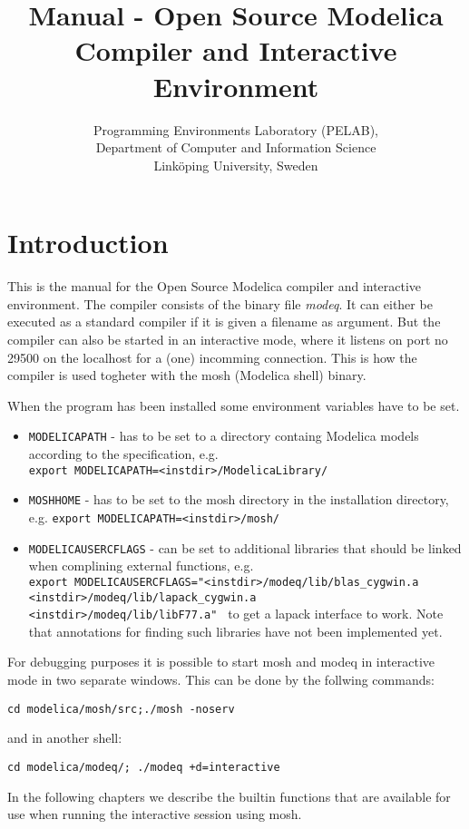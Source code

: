 \documentclass{report}
\title{Manual - Open Source Modelica Compiler and Interactive Environment}
\author{Programming Environments Laboratory (PELAB), \\ Department of Computer and Information Science \\ Link\"{o}ping University, Sweden}
\begin{document}
\maketitle
\chapter{Introduction}
This is the manual for the Open Source Modelica compiler and
interactive environment. The compiler consists of the binary file
\emph{modeq}. It can either be executed as a standard compiler if it
is given a filename as argument. But the compiler can also be started
in an interactive mode, where it listens on port no 29500 on the
localhost for a (one) incomming connection. This is how the compiler
is used togheter with the mosh (Modelica shell) binary.

When the program has been installed some environment variables have to
be set.
\begin{itemize}
\item{{\tt MODELICAPATH}} - has to be set to a directory containg Modelica
models according to the specification, e.g.  \\ {\tt export
MODELICAPATH=<instdir>/ModelicaLibrary/ }
\item{{\tt MOSHHOME}} - has to be set to the mosh directory in the
installation directory, e.g. {\tt export
MODELICAPATH=<instdir>/mosh/ } 
\item{{\tt MODELICAUSERCFLAGS}} - can be set to additional libraries
that should be linked when complining external functions, e.g. \\
{\tt export MODELICAUSERCFLAGS="<instdir>/modeq/lib/blas\_cygwin.a \\
<instdir>/modeq/lib/lapack\_cygwin.a  \\
<instdir>/modeq/lib/libF77.a" } to
get a lapack interface to work. Note that annotations for finding such
libraries have not been implemented yet.
\end{itemize}

For debugging purposes it is possible to start mosh and modeq in
interactive mode in two separate windows. This can be done by the
follwing commands:
\begin{verbatim}
cd modelica/mosh/src;./mosh -noserv
\end{verbatim}
and in another shell:
\begin{verbatim}
cd modelica/modeq/; ./modeq +d=interactive 
\end{verbatim}

In the following chapters we describe the builtin functions that are
available for use when running the interactive session using mosh.
\end{document}
